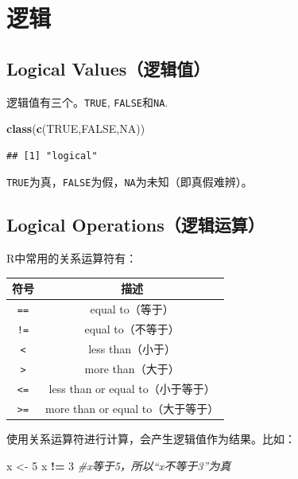 \documentclass[]{book}
\newenvironment{Shaded}{\begin{snugshade}}{\end{snugshade}}
\newcommand{\CommentTok}[1]{\textcolor[rgb]{0.56,0.35,0.01}{\textit{#1}}}
\newcommand{\DecValTok}[1]{\textcolor[rgb]{0.00,0.00,0.81}{#1}}
\newcommand{\KeywordTok}[1]{\textcolor[rgb]{0.13,0.29,0.53}{\textbf{#1}}}
\newcommand{\NormalTok}[1]{#1}
\newcommand{\OperatorTok}[1]{\textcolor[rgb]{0.81,0.36,0.00}{\textbf{#1}}}
\newcommand{\OtherTok}[1]{\textcolor[rgb]{0.56,0.35,0.01}{#1}}
\newcommand{\StringTok}[1]{\textcolor[rgb]{0.31,0.60,0.02}{#1}}
\begin{document}
\hypertarget{logical-operation}{%
\section{逻辑}\label{logical-operation}}

\hypertarget{logical-values}{%
\subsection{Logical Values（逻辑值）}\label{logical-values}}

逻辑值有三个。\texttt{TRUE}, \texttt{FALSE}和\texttt{NA}.

\begin{Shaded}
\begin{Highlighting}[]
\KeywordTok{class}\NormalTok{(}\KeywordTok{c}\NormalTok{(}\OtherTok{TRUE}\NormalTok{,}\OtherTok{FALSE}\NormalTok{,}\OtherTok{NA}\NormalTok{))}
\end{Highlighting}
\end{Shaded}

\begin{verbatim}
## [1] "logical"
\end{verbatim}

\texttt{TRUE}为真，\texttt{FALSE}为假，\texttt{NA}为未知（即真假难辨）。

\hypertarget{logical-operations}{%
\subsection{Logical Operations（逻辑运算）}\label{logical-operations}}

R中常用的关系运算符有：

\begin{longtable}[]{@{}cc@{}}
\toprule
符号 & 描述\tabularnewline
\midrule
\endhead
\texttt{==} & equal to（等于）\tabularnewline
\texttt{!=} & equal to（不等于）\tabularnewline
\texttt{\textless{}} & less than（小于）\tabularnewline
\texttt{\textgreater{}} & more than（大于）\tabularnewline
\texttt{\textless{}=} & less than or equal to（小于等于）\tabularnewline
\texttt{\textgreater{}=} & more than or equal to（大于等于）\tabularnewline
\bottomrule
\end{longtable}

使用关系运算符进行计算，会产生逻辑值作为结果。比如：

\begin{Shaded}
\begin{Highlighting}[]
\NormalTok{x <-}\StringTok{ }\DecValTok{5}
\NormalTok{x }\OperatorTok{!=}\StringTok{ }\DecValTok{3} \CommentTok{#x等于5，所以“x不等于3”为真}
\end{Highlighting}
\end{Shaded}
\end{document}
